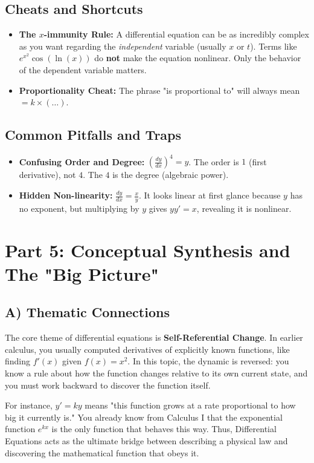 \documentclass[11pt]{article}
\begin{document}
\subsection*{Cheats and Shortcuts}
\begin{itemize}
    \item \textbf{The $x$-immunity Rule:} A differential equation can be as incredibly complex as you want regarding the \textit{independent} variable (usually $x$ or $t$). Terms like $e^{x^2}\cos(\ln(x))$ do \textbf{not} make the equation nonlinear. Only the behavior of the dependent variable matters.
    \item \textbf{Proportionality Cheat:} The phrase "is proportional to" will always mean $= k \times (\dots)$. 
\end{itemize}

\subsection*{Common Pitfalls and Traps}
\begin{itemize}
    \item \textbf{Confusing Order and Degree:} $ \left(\frac{dy}{dx}\right)^4 = y$. The order is $1$ (first derivative), not $4$. The $4$ is the degree (algebraic power).
    \item \textbf{Hidden Non-linearity:} $\frac{dy}{dx} = \frac{x}{y}$. It looks linear at first glance because $y$ has no exponent, but multiplying by $y$ gives $y y' = x$, revealing it is nonlinear.
\end{itemize}

\section{Part 5: Conceptual Synthesis and The "Big Picture"}

\subsection{A) Thematic Connections}
The core theme of differential equations is \textbf{Self-Referential Change}. In earlier calculus, you usually computed derivatives of explicitly known functions, like finding $f'(x)$ given $f(x) = x^2$. In this topic, the dynamic is reversed: you know a rule about how the function changes relative to its own current state, and you must work backward to discover the function itself. 

For instance, $y' = ky$ means "this function grows at a rate proportional to how big it currently is." You already know from Calculus I that the exponential function $e^{kx}$ is the only function that behaves this way. Thus, Differential Equations acts as the ultimate bridge between describing a physical law and discovering the mathematical function that obeys it.
\end{document}
